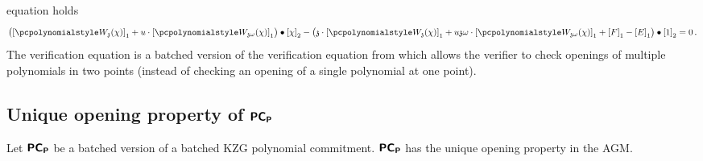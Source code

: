 \documentclass[runningheads,11pt]{llncs}
\begin{document}
\begin{description}
  equation holds
	\begin{multline}
		\label{eq:ver_eq}
		\left( \gone{\p{W_{\chz}}(\chi)} + u \cdot \gone{\p{W_{\chz
                \omega}}(\chi)} \right) \bullet
		\gtwo{\chi} - %
		\left( \chz \cdot \gone{\p{W_{\chz}}(\chi)} + u \chz \omega \cdot
          \gone{\p{W_{\chz \omega}}(\chi)} + \gone{F} - \gone{E} \right) \bullet
        \gtwo{1} = 0\,.
	\end{multline}
  The verification equation is a batched version of the verification equation
  from \cite{AC:KatZavGol10} which allows the verifier to check openings of
  multiple polynomials in two points (instead of checking an opening of a single
  polynomial at one point).
\end{description}

\subsection{Unique opening property of $\bm{\mathsf{PC}}_{\bm{\mathsf{P}}}$}
\begin{lemma}
\label{lem:pcomp_unique_op}
Let $\bm{\mathsf{PC}}_{\bm{\mathsf{P}}}$ be a batched version of a batched KZG polynomial
commitment. $\bm{\mathsf{PC}}_{\bm{\mathsf{P}}}$ has the unique opening property in the AGM.\end{lemma}
\end{document}
